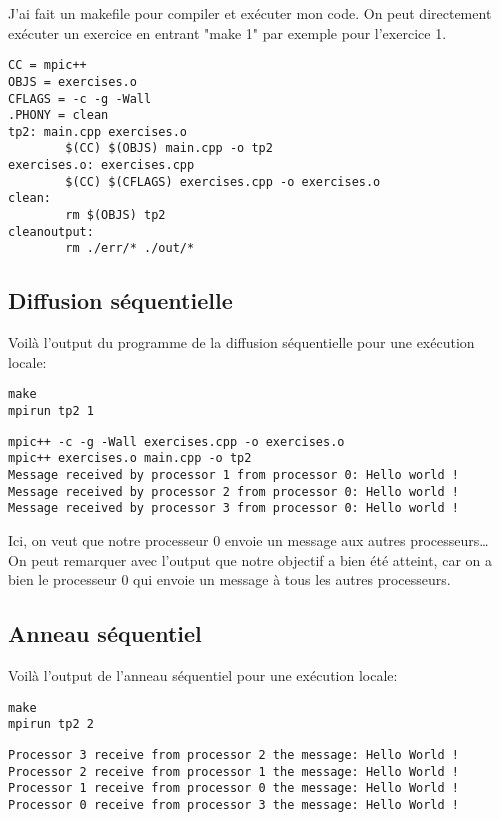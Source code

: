 \documentclass[11pt]{article}
\begin{document}
J'ai fait un makefile pour compiler et exécuter mon code. On peut directement exécuter un exercice en entrant "make 1" par exemple pour l'exercice 1.
\begin{verbatim}
CC = mpic++
OBJS = exercises.o
CFLAGS = -c -g -Wall
.PHONY = clean
tp2: main.cpp exercises.o
        $(CC) $(OBJS) main.cpp -o tp2
exercises.o: exercises.cpp
        $(CC) $(CFLAGS) exercises.cpp -o exercises.o
clean:
        rm $(OBJS) tp2
cleanoutput:
        rm ./err/* ./out/*
\end{verbatim}
\subsection{Diffusion séquentielle}
\label{sec:org0c8947e}
Voilà l'output du programme de la diffusion séquentielle pour une exécution locale:
\begin{verbatim}
make
mpirun tp2 1
\end{verbatim}

\begin{verbatim}
mpic++ -c -g -Wall exercises.cpp -o exercises.o
mpic++ exercises.o main.cpp -o tp2
Message received by processor 1 from processor 0: Hello world !
Message received by processor 2 from processor 0: Hello world !
Message received by processor 3 from processor 0: Hello world !
\end{verbatim}


Ici, on veut que notre processeur 0 envoie un message aux autres processeurs\ldots{} On peut remarquer avec l'output que notre objectif a bien été atteint,
car on a bien le processeur 0 qui envoie un message à tous les autres processeurs.

\subsection{Anneau séquentiel}
\label{sec:orgc4e0a82}

Voilà l'output de l'anneau séquentiel pour une exécution locale:

\begin{verbatim}
make
mpirun tp2 2
\end{verbatim}

\begin{verbatim}
Processor 3 receive from processor 2 the message: Hello World !
Processor 2 receive from processor 1 the message: Hello World !
Processor 1 receive from processor 0 the message: Hello World !
Processor 0 receive from processor 3 the message: Hello World !
\end{verbatim}
\end{document}
